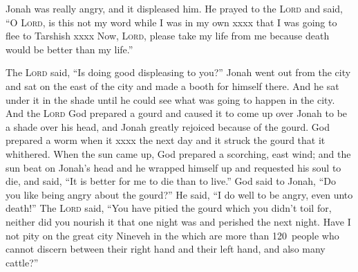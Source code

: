 
\begin{inparaenum}
     Jonah was really angry, and it displeased him.%
     He prayed to the \textsc{Lord} and said, ``O \textsc{Lord}, is this not my word while I was in my own xxxx that I was going to flee to Tarshish xxxx%
     Now, \textsc{Lord}, please take my life from me because death would be better than my life.''%
    
     The \textsc{Lord} said, ``Is doing good displeasing to you?''%
     Jonah went out from the city and sat on the east of the city and made a booth for himself there. And he sat under it in the shade until he could see what was going to happen in the city.%
     And the \textsc{Lord} God prepared a gourd and caused it to come up over Jonah to be a shade over his head, and Jonah greatly rejoiced because of the gourd.%
     God prepared a worm when it xxxx the next day and it struck the gourd that it whithered.%
     When the sun came up, God prepared a scorching, east wind; and the sun beat on Jonah's head and he wrapped himself up and requested his soul to die, and said, ``It is better for me to die than to live.''%
     God said to Jonah, ``Do you like being angry about the gourd?'' He said, ``I do well to be angry, even unto death!''%
     The \textsc{Lord} said, ``You have pitied the gourd which you didn't toil for, neither did you nourish it that one night was and perished the next night.%
     Have I not pity on the great city Nineveh in the which are more than 120~people who cannot discern between their right hand and their left hand, and also many cattle?''%
\end{inparaenum}
